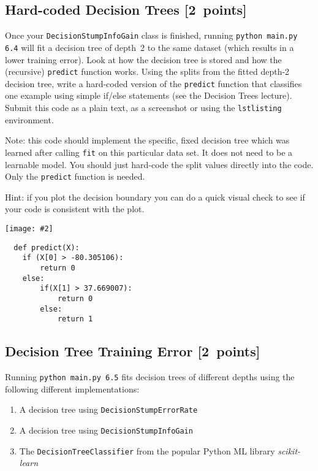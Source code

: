 \documentclass{article}
\newcommand{\blu}[1]{{\textcolor{blu}{#1}}}
\let\ask\blu
\newcommand\pts[1]{\textcolor{pointscolour}{[#1~points]}}
\newcommand{\centerfig}[2]{\begin{center}\texttt{[image: \#2]}\end{center}}
\begin{document}
  


  \subsection{Hard-coded Decision Trees \pts{2}}

  Once your \texttt{DecisionStumpInfoGain} class is finished, running \texttt{python main.py 6.4} will fit
  a decision tree of depth~2 to the same dataset (which results in a lower training error).
  Look at how the decision tree is stored and how the (recursive) \texttt{predict} function works.
  \ask{Using the splits from the fitted depth-2 decision tree, write a hard-coded version of the \texttt{predict}
  function that classifies one example using simple if/else statements
  (see the Decision Trees lecture). Submit this code as a plain text, as a screenshot or using the \texttt{lstlisting} environment.}

  Note: this code should implement the specific, fixed decision tree
  which was learned after calling \texttt{fit} on this particular data set. It does not need to be a learnable model.
  You should just hard-code the split values directly into the code.
  Only the \texttt{predict} function is needed.

  Hint: if you plot the decision boundary you can do a quick visual check to see if your code is consistent with the plot.
  \centerfig{0.7}{./figs/q6_4_decisionBoundary}
 
 \begin{verbatim}
  def predict(X):
    if (X[0] > -80.305106):
        return 0
    else:
        if(X[1] > 37.669007):
            return 0
        else:
            return 1
  \end{verbatim}
  



  \subsection{Decision Tree Training Error \pts{2}}

  Running \texttt{python main.py 6.5} fits decision trees of different depths using the following different implementations:
  \begin{enumerate}
  \item A decision tree using \texttt{DecisionStumpErrorRate}
  \item A decision tree using \texttt{DecisionStumpInfoGain}
  \item The \texttt{DecisionTreeClassifier} from the popular Python ML library \emph{scikit-learn}
  \end{enumerate}
\end{document}
